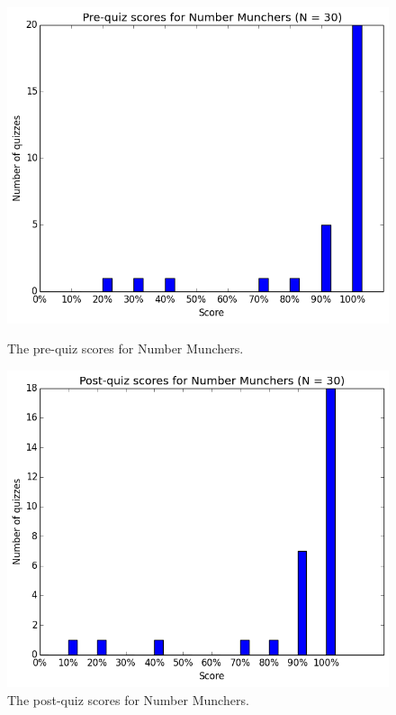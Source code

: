			\begin{figure}[] 
			\centering 
			\begin{minipage}[b]{0.45\linewidth}
			\includegraphics[width=\textwidth]{munchers_pre.png} 
			\caption{The pre-quiz scores for Number Munchers.}
			\end{minipage}
			\quad
			\begin{minipage}[b]{0.45\linewidth}
			\includegraphics[width=\textwidth]{munchers_post.png} 
			\caption{The post-quiz scores for Number Munchers.}
			\end{minipage}
			\end{figure}


